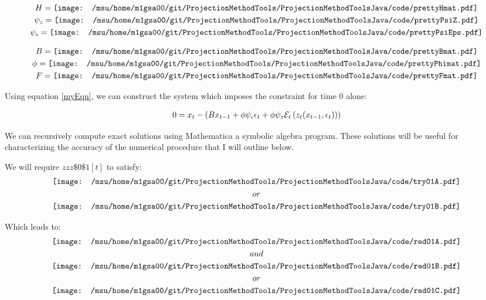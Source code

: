 \documentclass[12pt]{article}
\begin{document}
\begin{gather*}
  H= \vcenter{\hbox{\texttt{[image: /msu/home/m1gsa00/git/ProjectionMethodTools/ProjectionMethodToolsJava/code/prettyHmat.pdf]}}}\\
\psi_z=   \vcenter{\hbox{\texttt{[image: /msu/home/m1gsa00/git/ProjectionMethodTools/ProjectionMethodToolsJava/code/prettyPsiZ.pdf]}}}\\
\psi_\epsilon=   \vcenter{\hbox{\texttt{[image: /msu/home/m1gsa00/git/ProjectionMethodTools/ProjectionMethodToolsJava/code/prettyPsiEps.pdf]}}}\\
\end{gather*}




 \begin{gather*}
B=   \vcenter{\hbox{\texttt{[image: /msu/home/m1gsa00/git/ProjectionMethodTools/ProjectionMethodToolsJava/code/prettyBmat.pdf]}}}\\
\phi=   \vcenter{\hbox{\texttt{[image: /msu/home/m1gsa00/git/ProjectionMethodTools/ProjectionMethodToolsJava/code/prettyPhimat.pdf]}}}\\
F=   \vcenter{\hbox{\texttt{[image: /msu/home/m1gsa00/git/ProjectionMethodTools/ProjectionMethodToolsJava/code/prettyFmat.pdf]}}}
 \end{gather*}


Using equation \ref{myEqn}, we can construct the system which imposes the 
constraint for time 0 alone:

\begin{gather*}
0= x_t-(B x_{t-1}+ \phi \psi_\epsilon\epsilon_t + \phi \psi_z 
\mathcal{E}_t \left ( z_{t}(x_{t-1},\epsilon_t)     \right ) )
\end{gather*}

We can recursively compute exact solutions using
Mathematica a symbolic algebra program.  These solutions will be useful for
characterizing the accuracy of the numerical procedure that I will outline
below.

We will require $zzz\$0\$1[t]$ to satisfy:
 \begin{gather*}
\vcenter{\hbox{\texttt{[image: /msu/home/m1gsa00/git/ProjectionMethodTools/ProjectionMethodToolsJava/code/try01A.pdf]}}}\\
or\\
\vcenter{\hbox{\texttt{[image: /msu/home/m1gsa00/git/ProjectionMethodTools/ProjectionMethodToolsJava/code/try01B.pdf]}}}\\
 \end{gather*}


Which leads to:
 \begin{gather*}
\vcenter{\hbox{\texttt{[image: /msu/home/m1gsa00/git/ProjectionMethodTools/ProjectionMethodToolsJava/code/red01A.pdf]}}}\\
and\\
\vcenter{\hbox{\texttt{[image: /msu/home/m1gsa00/git/ProjectionMethodTools/ProjectionMethodToolsJava/code/red01B.pdf]}}}\\
or\\
\vcenter{\hbox{\texttt{[image: /msu/home/m1gsa00/git/ProjectionMethodTools/ProjectionMethodToolsJava/code/red01C.pdf]}}}
 \end{gather*}
\end{document}
